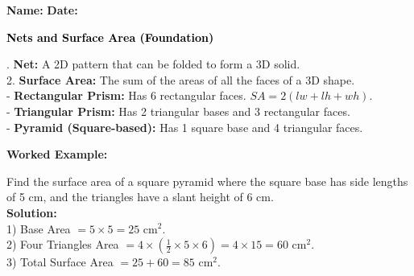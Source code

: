 \documentclass[12pt, letterpaper, fleqn]{article}
\begin{document}
\textbf{Name:} \underline{\hspace{5cm}}
\hfill
\textbf{Date:} \underline{\hspace{3cm}}\\

\begin{tcolorbox}[colback=black!10]
    \large\textcolor{black}{\textbf{Nets and Surface Area (Foundation)}}
\end{tcolorbox}

\vspace{3mm}

. \textbf{Net:} A 2D pattern that can be folded to form a 3D solid. \\
2. \textbf{Surface Area:} The sum of the areas of all the faces of a 3D shape. \\
- \textbf{Rectangular Prism:} Has 6 rectangular faces. $SA = 2(lw + lh + wh)$. \\
- \textbf{Triangular Prism:} Has 2 triangular bases and 3 rectangular faces. \\
- \textbf{Pyramid (Square-based):} Has 1 square base and 4 triangular faces.

\vspace{4mm}

\begin{tcolorbox}[colback=white, colframe=black!25, boxrule=0.6pt, arc=4mm, left=6mm, right=6mm, top=5mm, bottom=5mm]
\textbf{Worked Example:}

\medskip
\noindent
Find the surface area of a square pyramid where the square base has side lengths of 5 cm, and the triangles have a slant height of 6 cm.\\
\textbf{Solution:}\\
1) Base Area $= 5 \times 5 = 25\text{ cm}^2$.\\
2) Four Triangles Area $= 4 \times \left(\frac{1}{2} \times 5 \times 6\right) = 4 \times 15 = 60\text{ cm}^2$.\\
3) Total Surface Area $= 25 + 60 = 85\text{ cm}^2$.
\end{tcolorbox}

\vspace{4mm}
\end{document}
